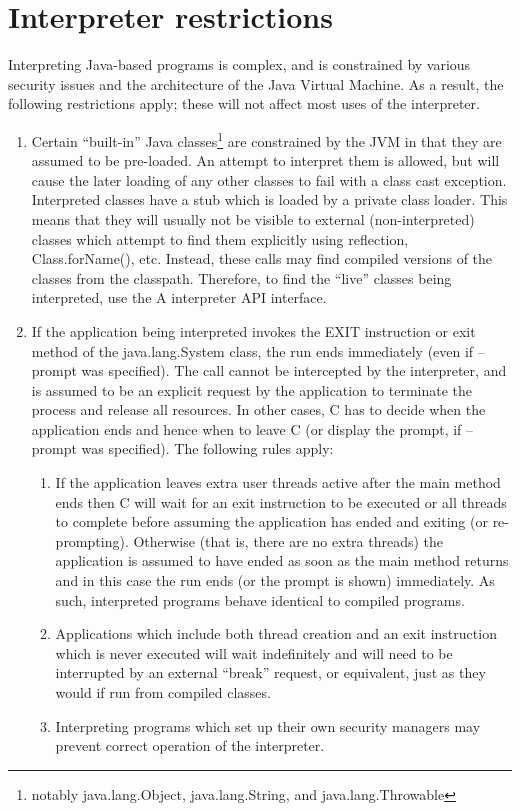 \section{Interpreter restrictions} 
Interpreting Java-based programs is complex, and is constrained by various security issues and the architecture of the Java Virtual Machine. As a result, the following restrictions apply; these will not affect most uses of the interpreter. 
\begin{enumerate}
\item Certain “built-in” Java classes\footnote{notably java.lang.Object, java.lang.String, and java.lang.Throwable} are constrained by the JVM in that they are assumed to be pre-loaded. An attempt to interpret them is allowed, but will cause the later loading of any other classes to fail with a class cast exception. 
Interpreted classes have a stub which is loaded by a private class loader. This means that they will usually not be visible to external (non-interpreted) classes which attempt to find them explicitly using reflection, Class.forName(), etc. Instead, these calls may find compiled versions of the classes from the classpath. Therefore, to find the “live” classes being interpreted, use the \nr{}A interpreter API interface. 
\item If the application being interpreted invokes the EXIT instruction or exit method of the java.lang.System class, the run ends immediately 
(even if –prompt was specified). The call cannot be intercepted by the interpreter, and is assumed to be an explicit request by the application to terminate the process and release all resources. 
In other cases, \nr{}C has to decide when the application ends and hence when to leave \nr{}C (or display the prompt, if –prompt was specified). The following rules apply:
\begin{enumerate} 
\item If the application leaves extra user threads active after the main method ends then \nr{}C will wait for an exit instruction to be executed or all threads to complete before assuming the application has ended and exiting (or re-prompting). 
Otherwise (that is, there are no extra threads) the application is assumed to have ended as soon as the main method returns and in this case the run ends (or the prompt is shown) immediately.
As such, interpreted programs behave identical to compiled programs. 
\item Applications which include both thread creation and an exit instruction which is never executed will wait indefinitely and will need to be interrupted by an external “break” request, or equivalent, just as they would if run from compiled classes. 
\item Interpreting programs which set up their own security managers may prevent correct operation of the interpreter. 
\end{enumerate}
\end{enumerate}
